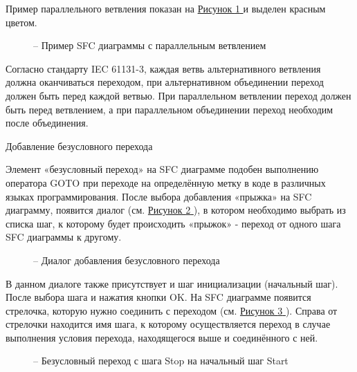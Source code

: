 \documentclass[letterpaper,10pt,russian]{sphinxmanual}
\begin{document}
Пример параллельного ветвления показан на \hyperref[usage_guide/ide_components:image107]{Рисунок \ref{usage_guide/ide_components:image107} } и выделен красным
цветом.
\begin{figure}[htbp]
\centering
\capstart

\noindent{}
\caption{– Пример SFC диаграммы с параллельным ветвлением}\label{usage_guide/ide_components:image107}\end{figure}

Согласно стандарту IEC 61131-3, каждая ветвь альтернативного ветвления
должна оканчиваться переходом, при альтернативном объединении переход
должен быть перед каждой ветвью. При параллельном ветвлении переход
должен быть перед ветвлением, а при параллельном объединении переход
необходим после объединения.

Добавление безусловного перехода

Элемент «безусловный переход» на SFC диаграмме подобен выполнению
оператора GOTO при переходе на определённую метку в коде в различных
языках программирования. После выбора добавления «прыжка» на SFC
диаграмму, появится диалог (см. \hyperref[usage_guide/ide_components:image108]{Рисунок \ref{usage_guide/ide_components:image108} }), в котором необходимо выбрать
из списка шаг, к которому будет происходить «прыжок» - переход от одного
шага SFC диаграммы к другому.
\begin{figure}[htbp]
\centering
\capstart

\noindent{}
\caption{– Диалог добавления безусловного перехода}\label{usage_guide/ide_components:image108}\end{figure}

В данном диалоге также присутствует и шаг инициализации (начальный шаг).
После выбора шага и нажатия кнопки OK. На SFC диаграмме появится
стрелочка, которую нужно соединить с переходом (см. \hyperref[usage_guide/ide_components:image109]{Рисунок \ref{usage_guide/ide_components:image109} }). Справа от
стрелочки находится имя шага, к которому осуществляется переход в случае
выполнения условия перехода, находящегося выше и соединённого с ней.
\begin{figure}[htbp]
\centering
\capstart

\noindent{}
\caption{– Безусловный переход с шага Stop на начальный шаг Start}\label{usage_guide/ide_components:image109}\end{figure}
\end{document}
